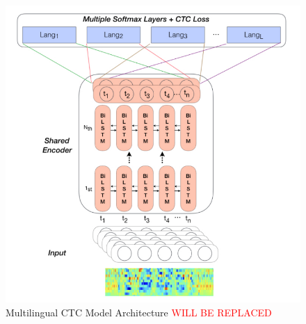 \begin{figure}[t]
    \centering
    \includegraphics[width=\linewidth]{figs/model_arch.png}
    \caption{Multilingual CTC Model Architecture \textcolor{red}{WILL BE REPLACED}}
    \label{fig:model-arch}
\end{figure}
